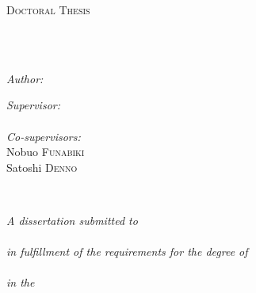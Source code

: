 \documentclass[
12pt, %
english, %
singlespacing, %
liststotoc, %
toctotoc, %
parskip, %
headsepline, %
consistentlayout, %
]{MastersDoctoralThesis} %
\begin{document}
\begin{titlepage}
\begin{center}

\vspace*{.06\textheight}
\textsc{\Large Doctoral Thesis}\\[0.5cm] %

\HRule \\[0.4cm] %
{\huge \bfseries \ttitle\par}\vspace{0.4cm} %
\HRule \\[1.5cm] %
 
\begin{minipage}[t]{0.5\textwidth}
\begin{flushleft} \large
\emph{Author:}\\
{\authorname} %
\end{flushleft}
\end{minipage}
\begin{minipage}[t]{0.4\textwidth}
\begin{flushright} \large
\emph{Supervisor:} \\
\href{http://isec.ec.okayama-u.ac.jp/nogami}{\supname} %
\vspace{0.1cm}\\
\emph{Co-supervisors:} \\
Nobuo \textsc{Funabiki} \\
Satoshi \textsc{Denno} 
\end{flushright}
\end{minipage}\\[2.5cm]
\vfill

\large \textit{A dissertation submitted  to \\[0.2cm]
	{\scshape\LARGE \univname}\\[0.2cm]
	in fulfillment of the requirements for the degree of} \\ [0.2cm]
	{ \large \degreename}\\[0.2cm] 
\textit{in the} \\
\groupname\\
\deptname\\[2cm] %


\end{center}
\end{titlepage}
\end{document}
